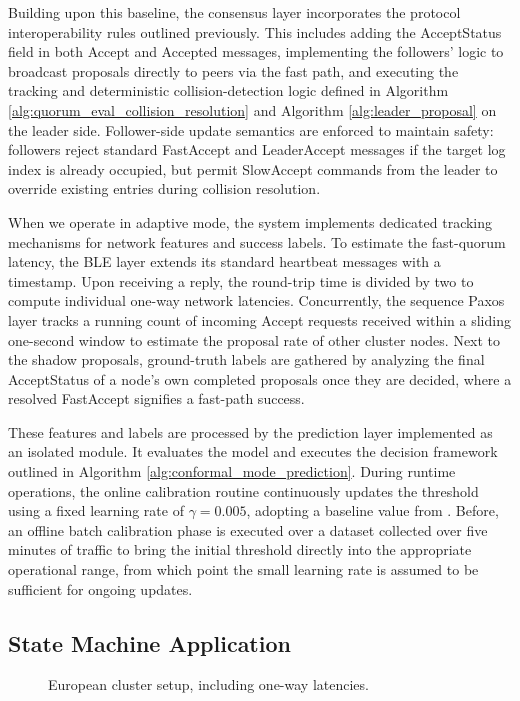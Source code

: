 Building upon this baseline, the consensus layer incorporates the protocol interoperability rules outlined previously. This includes adding the AcceptStatus field in both Accept and Accepted messages, implementing the followers' logic to broadcast proposals directly to peers via the fast path, and executing the tracking and deterministic collision-detection logic defined in Algorithm \ref{alg:quorum_eval_collision_resolution} and Algorithm \ref{alg:leader_proposal} on the leader side. Follower-side update semantics are enforced to maintain safety: followers reject standard FastAccept and LeaderAccept messages if the target log index is already occupied, but permit SlowAccept commands from the leader to override existing entries during collision resolution.

When we operate in adaptive mode, the system implements dedicated tracking mechanisms for network features and success labels. To estimate the fast-quorum latency, the \gls{BLE} layer extends its standard heartbeat messages with a timestamp. Upon receiving a reply, the round-trip time is divided by two to compute individual one-way network latencies. Concurrently, the sequence Paxos layer tracks a running count of incoming Accept requests received within a sliding one-second window to estimate the proposal rate of other cluster nodes. Next to the shadow proposals, ground-truth labels are gathered by analyzing the final AcceptStatus of a node's own completed proposals once they are decided, where a resolved FastAccept signifies a fast-path success.


These features and labels are processed by the prediction layer implemented as an isolated module. It evaluates the model and executes the decision framework outlined in Algorithm \ref{alg:conformal_mode_prediction}. During runtime operations, the online calibration routine continuously updates the threshold using a fixed learning rate of $\gamma = 0.005$, adopting a baseline value from \cite{Angelopoulus-NeuralInformationProcessing-2023}. Before, an offline batch calibration phase is executed over a dataset collected over five minutes of traffic to bring the initial threshold directly into the appropriate operational range, from which point the small learning rate is assumed to be sufficient for ongoing updates.

\subsection{State Machine Application}
\begin{figure}[t!]
    \centering
    
    \caption{European cluster setup, including one-way latencies.}
    \label{fig:europe-cluster-setup}
\end{figure}

